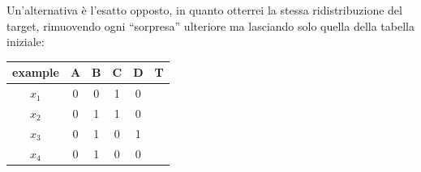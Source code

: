 \begin{esempio}
\begin{table}[H]
  \end{table}
  Un'alternativa è l'esatto opposto, in quanto otterrei la stessa
  ridistribuzione del target, rimuovendo ogni ``sorpresa'' ulteriore ma
  lasciando solo quella della tabella iniziale:
  \begin{table}[H]
    \centering
    \begin{tabular}{c|c|c|c|c|c}
      example & A & B & C & D & T\\
      \hline
      $x_1$ & 0 & 0 & 1 & 0 & \color{darkgreen}{1}\\
      $x_2$ & 0 & 1 & 1 & 0 & \color{darkgreen}{1}\\
      $x_3$ & 0 & 1 & 0 & 1 & \color{red}{0}\\
      $x_4$ & 0 & 1 & 0 & 0 & \color{darkgreen}{1}\\
    \end{tabular}
  \end{table}
\end{esempio}
